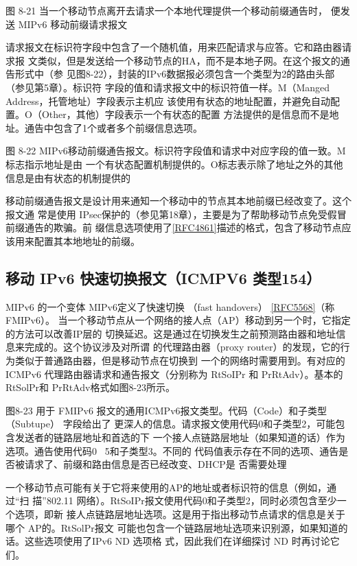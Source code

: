 图 8-21 当一个移动节点离开去请求一个本地代理提供一个移动前缀通告时，
便发送 MIPv6 移动前缀请求报文

请求报文在标识符字段中包含了一个随机值，用来匹配请求与应答。它和路由器请求报
文类似，但是发送给一个移动节点的HA，而不是本地子网。在这个报文的通告形式中（参
见图8-22），封装的IPv6数据报必须包含一个类型为2的路由头部（参见第5章）。标识符
字段的值和请求报文中的标识符值一样。M（Manged Address，托管地址）字段表示主机应
该使用有状态的地址配置，并避免自动配置。O（Other，其他）字段表示一个有状态的配置
方法提供的是信息而不是地址。通告中包含了1个或者多个前缀信息选项。

图 8-22 MIPv6移动前缀通告报文。标识符字段值和请求中对应字段的值一致。M标志指示地址是由
一个有状态配置机制提供的。O标志表示除了地址之外的其他信息是由有状态的机制提供的

移动前缀通告报文是设计用来通知一个移动中的节点其本地前缀已经改变了。这个报文通
常是使用 IPsec保护的（参见第18章），主要是为了帮助移动节点免受假冒前缀通告的欺骗。前
缀信息选项使用了\href{https://www.rfc-editor.org/rfc/rfc4861}{[RFC4861]}描述的格式，包含了移动节点应该用来配置其本地地址的前缀。
\subsection{移动 IPv6 快速切换报文（ICMPV6 类型154）}
MIPv6 的一个变体 MIPv6定义了快速切换 （fast handovers） \href{https://www.rfc-editor.org/rfc/rfc5568}{[RFC5568]}（称 FMIPv6）。
当一个移动节点从一个网络的接人点（AP）移动到另一个时，它指定的方法可以改善IP层的
切换延迟。这是通过在切换发生之前预测路由器和地址信息来完成的。这个协议涉及对所谓
的代理路由器（proxy router）的发现，它的行为类似于普通路由器，但是移动节点在切换到
一个的网络时需要用到。有对应的ICMPv6 代理路由器请求和通告报文（分别称为 RtSoIPr
和 PrRtAdv）。基本的RtSolPr和 PrRtAdv格式如图8-23所示。

图8-23 用于 FMIPv6 报文的通用ICMPv6报文类型。代码（Code）和子类型（Subtupe） 字段给出了
更深人的信息。请求报文使用代码0和子类型2，可能包含发送者的链路层地址和首选的下
一个接人点链路层地址（如果知道的话）作为选项。通告使用代码0~ 5和子类型3。不同的
代码值表示存在不同的选项、通告是否被请求了、前缀和路由信息是否已经改变、DHCP是
否需要处理

一个移动节点可能有关于它将来使用的AP的地址或者标识符的信息（例如，通过“扫
描”802.11 网络）。RtSoIPr报文使用代码0和子类型2，同时必须包含至少一个选项，即新
接人点链路层地址选项。这是用于指出移动节点请求的信息是关于哪个 AP的。RtSolPr报文
可能也包含一个链路层地址选项来识别源，如果知道的话。这些选项使用了IPv6 ND 选项格
式，因此我们在详细探讨 ND 时再讨论它们。

